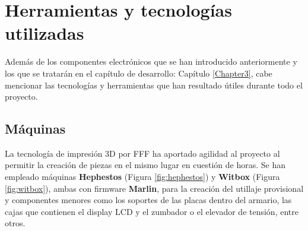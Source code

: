 \section{Herramientas y tecnologías utilizadas}

Además de los componentes electrónicos que se han introducido anteriormente y los que se tratarán en el capítulo de desarrollo: Capítulo \ref{Chapter3}, cabe mencionar las tecnologías y herramientas que han resultado útiles durante todo el proyecto.

\subsection{Máquinas}

La tecnología de impresión 3D por FFF ha aportado agilidad al proyecto al permitir la creación de piezas en el mismo lugar en cuestión de horas. Se han empleado máquinas \textbf{Hephestos} (Figura \ref{fig:hephestos}) y \textbf{Witbox} (Figura \ref{fig:witbox}), ambas con firmware \textbf{Marlin}, para la creación del utillaje provisional y componentes menores como los soportes de las placas dentro del armario, las cajas que contienen el display LCD y el zumbador o el elevador de tensión, entre otros.

